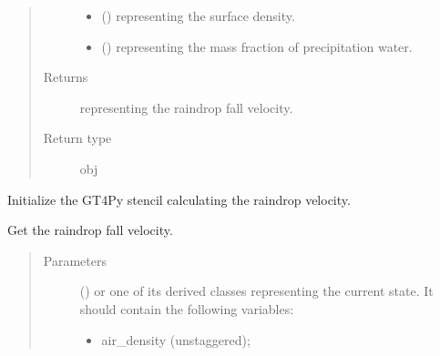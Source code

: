 \documentclass[letterpaper,10pt,english]{sphinxmanual}
\begin{document}
\begin{fulllineitems}
\begin{fulllineitems}
\begin{quote}
\begin{description}
\begin{itemize}
\item {} 
 () \textendash{}  representing the surface density.

\item {} 
 () \textendash{}  representing the mass fraction of precipitation water.

\end{itemize}

\item[{Returns}] \leavevmode
{} representing the raindrop fall velocity.

\item[{Return type}] \leavevmode
obj

\end{description}\end{quote}

\end{fulllineitems}


\begin{fulllineitems}
\label{\detokenize{api:tasmania.parameterizations.adjustment_microphysics_kessler_wrf.AdjustmentMicrophysicsKesslerWRF._stencil_raindrop_fall_velocity_initialize}}
Initialize the GT4Py stencil calculating the raindrop velocity.

\end{fulllineitems}


\begin{fulllineitems}
\label{\detokenize{api:tasmania.parameterizations.adjustment_microphysics_kessler_wrf.AdjustmentMicrophysicsKesslerWRF.get_raindrop_fall_velocity}}
Get the raindrop fall velocity.
\begin{quote}\begin{description}
\item[{Parameters}] \leavevmode
{} () \textendash{} 
{\hyperref[\detokenize{api:tasmania.storages.grid_data.GridData}]{}} or one of its derived classes representing the current state.
It should contain the following variables:
\begin{itemize}
\item {} 
air\_density (unstaggered);


\end{itemize}
\end{description}
\end{quote}
\end{fulllineitems}
\end{fulllineitems}
\end{document}
